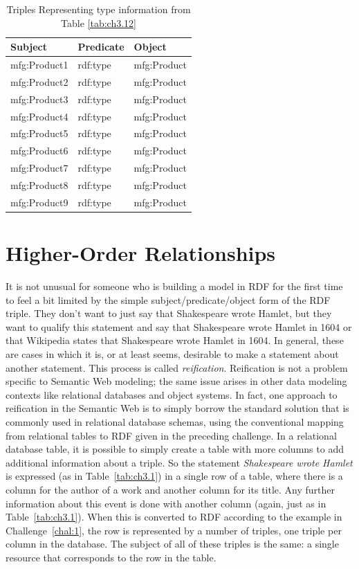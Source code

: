\begin{challenge}
\begin{table}[h]
\centering
\begin{tabular}{||l l l ||} 
 \hline
 Subject&Predicate&Object \\ [0.5ex] 
 \hline\hline
mfg:Product1&rdf:type&mfg:Product\\
mfg:Product2&rdf:type&mfg:Product\\
mfg:Product3&rdf:type&mfg:Product\\
mfg:Product4&rdf:type&mfg:Product\\
mfg:Product5&rdf:type&mfg:Product\\
mfg:Product6&rdf:type&mfg:Product\\
mfg:Product7&rdf:type&mfg:Product\\
mfg:Product8&rdf:type&mfg:Product\\
mfg:Product9&rdf:type&mfg:Product\\
\hline
\end{tabular}
\caption{Triples Representing type information from Table \ref{tab:ch3.12}}
\label{tab:ch3.14}
\end{table}

\end{challenge}

\section{Higher-Order Relationships}
\label{ch5.reification}

It is not unusual for someone who is building a model in RDF for the
first time to feel a bit limited by the simple subject/predicate/object
form of the RDF triple. They don't want to just say that Shakespeare
wrote Hamlet, but they want to qualify this statement and say that
Shakespeare wrote Hamlet in 1604 or that Wikipedia states that
Shakespeare wrote Hamlet in 1604. In general, these are cases in which
it is, or at least seems, desirable to make a statement about another
statement. This process is called \emph{reification}. Reification is not a
problem specific to Semantic Web modeling; the same issue arises in
other data modeling contexts like relational databases and object
systems. In fact, one approach to reification in the Semantic Web is to
simply borrow the standard solution that is commonly used in relational
database schemas, using the conventional mapping from relational tables
to RDF given in the preceding challenge. In a relational database table,
it is possible to simply create a table with more columns to add
additional information about a triple. So the statement
\emph{Shakespeare wrote Hamlet} is expressed (as in Table~\ref{tab:ch3.1}) in a
single row of a table, where there is a column for the author of a work
and another column for its title. Any further information about this
event is done with another column (again, just as in Table~\ref{tab:ch3.1}). When
this is converted to RDF according to the example in Challenge~\ref{chal:1}, the
row is represented by a number of triples, one triple per column in the
database. The subject of all of these triples is the same: a single
resource that corresponds to the row in the table.

